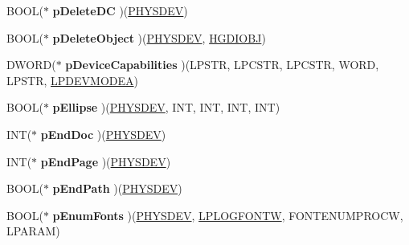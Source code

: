 \begin{DoxyCompactItemize}
\mbox{\label{structgdi__dc__funcs_acd387d169cd899effe83b524e9d781fb}} 
B\+O\+OL($\ast$ {\bfseries p\+Delete\+DC} )(\hyperlink{structgdi__physdev}{P\+H\+Y\+S\+D\+EV})
\item 
\mbox{\label{structgdi__dc__funcs_a2e7f9d82eb94fb7589d0561e558ddbe0}} 
B\+O\+OL($\ast$ {\bfseries p\+Delete\+Object} )(\hyperlink{structgdi__physdev}{P\+H\+Y\+S\+D\+EV}, \hyperlink{interfacevoid}{H\+G\+D\+I\+O\+BJ})
\item 
\mbox{\label{structgdi__dc__funcs_ab9c83b31ab0de4e468275884175b0b3a}} 
D\+W\+O\+RD($\ast$ {\bfseries p\+Device\+Capabilities} )(L\+P\+S\+TR, L\+P\+C\+S\+TR, L\+P\+C\+S\+TR, W\+O\+RD, L\+P\+S\+TR, \hyperlink{struct__devicemode_a}{L\+P\+D\+E\+V\+M\+O\+D\+EA})
\item 
\mbox{\label{structgdi__dc__funcs_a4ff93443186cd349d06657d27f591177}} 
B\+O\+OL($\ast$ {\bfseries p\+Ellipse} )(\hyperlink{structgdi__physdev}{P\+H\+Y\+S\+D\+EV}, I\+NT, I\+NT, I\+NT, I\+NT)
\item 
\mbox{\label{structgdi__dc__funcs_ab2126ef6ed8aa3d3c3067055e05b822d}} 
I\+NT($\ast$ {\bfseries p\+End\+Doc} )(\hyperlink{structgdi__physdev}{P\+H\+Y\+S\+D\+EV})
\item 
\mbox{\label{structgdi__dc__funcs_a78cb6897dfa339a2df068cb5954de132}} 
I\+NT($\ast$ {\bfseries p\+End\+Page} )(\hyperlink{structgdi__physdev}{P\+H\+Y\+S\+D\+EV})
\item 
\mbox{\label{structgdi__dc__funcs_a8520f52ea9b3de2676c0e3a91846c441}} 
B\+O\+OL($\ast$ {\bfseries p\+End\+Path} )(\hyperlink{structgdi__physdev}{P\+H\+Y\+S\+D\+EV})
\item 
\mbox{\label{structgdi__dc__funcs_ad622991c2f3f98fcefb8d3c85543d4f7}} 
B\+O\+OL($\ast$ {\bfseries p\+Enum\+Fonts} )(\hyperlink{structgdi__physdev}{P\+H\+Y\+S\+D\+EV}, \hyperlink{structtag_l_o_g_f_o_n_t_w}{L\+P\+L\+O\+G\+F\+O\+N\+TW}, F\+O\+N\+T\+E\+N\+U\+M\+P\+R\+O\+CW, L\+P\+A\+R\+AM)
\item 
\mbox{\label{structgdi__dc__funcs_a71d7de4689521fabab8a83735a5f6d9c}} 

\end{DoxyCompactItemize}
